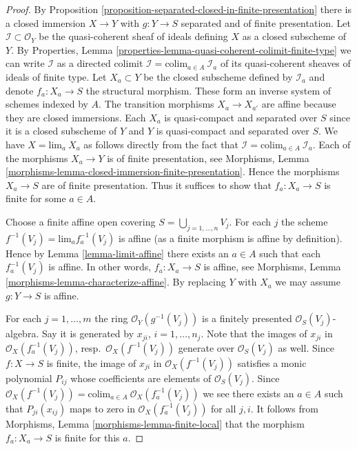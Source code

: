 \begin{proof}
By Proposition \ref{proposition-separated-closed-in-finite-presentation}
there is a closed immersion $X \to Y$ with $g : Y \to S$
separated and of finite presentation. Let $\mathcal{I} \subset \mathcal{O}_Y$
be the quasi-coherent sheaf of ideals defining $X$ as a closed
subscheme of $Y$. By
Properties, Lemma \ref{properties-lemma-quasi-coherent-colimit-finite-type} 
we can write $\mathcal{I}$ as a directed colimit
$\mathcal{I} = \text{colim}_{a \in A}\ \mathcal{I}_a$ of its
quasi-coherent sheaves of ideals of finite type.
Let $X_a \subset Y$ be the closed subscheme defined by $\mathcal{I}_a$
and denote $f_a : X_a \to S$ the structural morphism.
These form an inverse system of schemes indexed by $A$.
The transition morphisms $X_a \to X_{a'}$ are affine because
they are closed immersions. Each $X_a$ is quasi-compact and separated
over $S$ since it is a closed subscheme of $Y$ and $Y$ is quasi-compact and
separated over $S$.
We have $X = \text{lim}_a\ X_a$ as follows directly from the
fact that $\mathcal{I} = \text{colim}_{a \in A}\ \mathcal{I}_a$.
Each of the morphisms $X_a \to Y$ is of finite presentation, see
Morphisms, Lemma \ref{morphisms-lemma-closed-immersion-finite-presentation}.
Hence the morphisms $X_a \to S$ are of finite presentation.
Thus it suffices to show that $f_a : X_a \to S$ is finite for some
$a \in A$.

\medskip\noindent
Choose a finite affine open covering $S = \bigcup_{j = 1, \ldots, n} V_j$.
For each $j$ the scheme $f^{-1}(V_j) = \text{lim}_a f_a^{-1}(V_j)$
is affine (as a finite morphism is affine by definition). Hence by
Lemma \ref{lemma-limit-affine} there exists an $a \in A$ such that
each $f_a^{-1}(V_j)$ is affine. In other words, $f_a : X_a \to S$ is
affine, see Morphisms, Lemma \ref{morphisms-lemma-characterize-affine}.
By replacing $Y$ with $X_a$ we may assume $g : Y \to S$ is affine.

\medskip\noindent
For each $j = 1, \ldots, m$ the ring $\mathcal{O}_Y(g^{-1}(V_j))$
is a finitely presented $\mathcal{O}_S(V_j)$-algebra. Say it is
generated by $x_{ji}$, $i = 1, \ldots, n_j$. Note that the images
of $x_{ji}$ in $\mathcal{O}_X(f_a^{-1}(V_j))$, resp.\ 
$\mathcal{O}_X(f^{-1}(V_j))$ generate over $\mathcal{O}_S(V_j)$ as well.
Since $f : X \to S$ is
finite, the image of $x_{ji}$ in $\mathcal{O}_X(f^{-1}(V_j))$
satisfies a monic polynomial $P_{ij}$ whose coefficients
are elements of $\mathcal{O}_S(V_j)$. Since
$\mathcal{O}_X(f^{-1}(V_j)) =
\text{colim}_{a \in A}\ \mathcal{O}_X(f_a^{-1}(V_j))$
we see there exists an $a \in A$ such that
$P_{ji}(x_{ij})$ maps to zero in $\mathcal{O}_X(f_a^{-1}(V_j))$
for all $j, i$. It follows from
Morphisms, Lemma \ref{morphisms-lemma-finite-local}
that the morphism $f_a : X_a \to S$ is finite for this $a$.
\end{proof}








